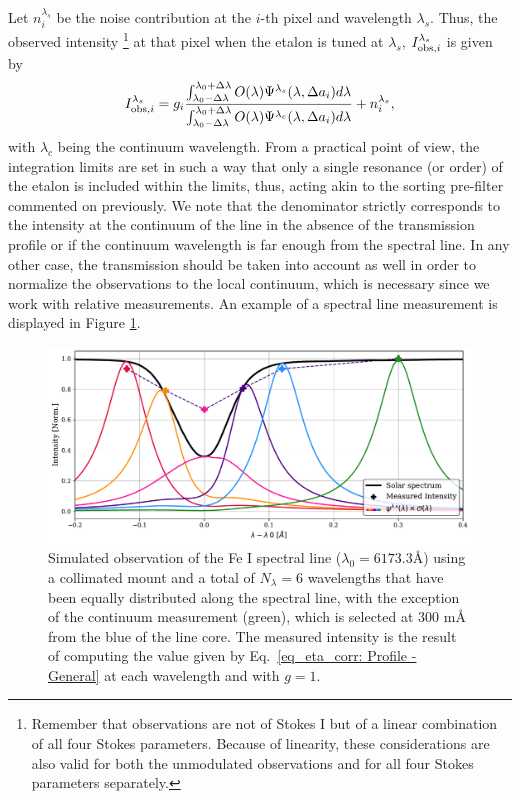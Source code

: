 Let $n _ i ^{\lambda_s}$ be the  noise contribution at the $i$-th pixel and wavelength $\lambda_s$. Thus, the observed intensity \footnote{Remember that observations are not of Stokes I but of a linear combination of all four Stokes parameters. Because of linearity, these considerations are also valid for both the unmodulated observations and for all four Stokes parameters separately.}
at that pixel when the etalon is tuned at $\lambda _s$, $I ^{\lambda _ s} _ {{\rm obs}, i}$ is given by 
\begin{equation}
I ^{\lambda _ s} _ {{\rm obs}, i} = g_i \frac{\int_{\lambda_0 - \Delta \lambda}^{\lambda_0 + \Delta \lambda} O(\lambda)\Psi^{\lambda _ s} (\lambda , \Delta a _i)  d\lambda}{\int_{\lambda_0 - \Delta \lambda}^{\lambda_0 + \Delta \lambda} O(\lambda)\Psi^{\lambda _ c} (\lambda, \Delta a _ i)  d\lambda} + n _ i ^{\lambda_s}    ,
\label{eq_eta_corr: Profile - General}
\end{equation}
with $\lambda _ c$ being the continuum wavelength. From a practical point of view, the integration limits are set in such a way that only a single resonance (or order) of the etalon is included within the limits, thus, acting akin to the sorting pre-filter commented on previously. We note that the denominator strictly corresponds to the intensity at the continuum of the line in the absence of the transmission profile or if the continuum wavelength is far enough from the spectral line. In any other case, the transmission should be taken into account as well in order to normalize the observations to the local continuum, which is necessary since we work with relative measurements. An example of a spectral line measurement is displayed in Figure \ref{fig_etalon_corr: Prof-Measure}.
\begin{figure}
    \centering
    \includegraphics[width = \textwidth]{figures/EtalonPaper/ProfileMeasurement.pdf}
    \caption[Simulation of a spectral line scan.]{Simulated observation of the Fe I spectral line ($\lambda _ 0 = 6173.3$\r{A}) using a collimated mount and a total of $N_ \lambda = 6$ wavelengths that have been equally distributed along the spectral line, with the exception of the continuum measurement (green), which is selected at $300$ m\r{A} from the blue of the line core. The measured intensity is the result of computing the value given by Eq.~\eqref{eq_eta_corr: Profile - General} at each wavelength and with $g = 1$.
    } \label{fig_etalon_corr: Prof-Measure}
\end{figure}

